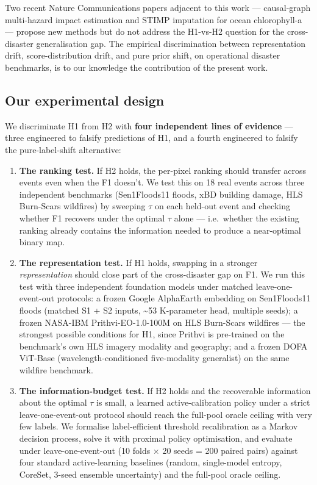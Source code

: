 Two recent Nature Communications papers \cite{xu2022causal,zhang2025stimp} adjacent
to this work --- causal-graph multi-hazard impact estimation and STIMP
imputation for ocean chlorophyll-a --- propose new methods but do not
address the H1-vs-H2 question for the cross-disaster generalisation
gap. The empirical discrimination between representation drift,
score-distribution drift, and pure prior shift, on operational
disaster benchmarks, is to our knowledge the contribution of the
present work.

\subsection{Our experimental design}\label{our-experimental-design}

We discriminate H1 from H2 with \textbf{four independent lines of evidence} ---
three engineered to falsify predictions of H1, and a fourth engineered
to falsify the pure-label-shift alternative:

\begin{enumerate}
\def\labelenumi{\arabic{enumi}.}
\item
  \textbf{The ranking test.} If H2 holds, the per-pixel ranking should
  transfer across events even when the F1 doesn't. We test this on
  18 real events across three independent benchmarks (Sen1Floods11
  floods, xBD building damage, HLS Burn-Scars wildfires) by sweeping $\tau$
  on each held-out event and checking whether F1 recovers under the
  optimal $\tau$ alone --- i.e.~whether the existing ranking already contains
  the information needed to produce a near-optimal binary map.
\item
  \textbf{The representation test.} If H1 holds, swapping in a stronger
  \emph{representation} should close part of the cross-disaster gap on F1.
  We run this test with three independent foundation models under
  matched leave-one-event-out protocols: a frozen Google AlphaEarth
  embedding on Sen1Floods11 floods (matched S1 + S2 inputs,
  \textasciitilde53 K-parameter head, multiple seeds); a frozen NASA-IBM
  Prithvi-EO-1.0-100M on HLS Burn-Scars wildfires --- the strongest
  possible conditions for H1, since Prithvi is pre-trained on the
  benchmark's own HLS imagery modality and geography; and a frozen
  DOFA ViT-Base (wavelength-conditioned five-modality generalist) on
  the same wildfire benchmark.
\item
  \textbf{The information-budget test.} If H2 holds and the recoverable
  information about the optimal $\tau$ is small, a learned active-calibration
  policy under a strict leave-one-event-out protocol should reach the
  full-pool oracle ceiling with very few labels. We formalise
  label-efficient threshold recalibration as a Markov decision process,
  solve it with proximal policy optimisation, and evaluate under
  leave-one-event-out (10 folds $\times$ 20 seeds = 200 paired pairs) against
  four standard active-learning baselines (random, single-model
  entropy, CoreSet, 3-seed ensemble uncertainty) and the full-pool
  oracle ceiling.
\end{enumerate}

